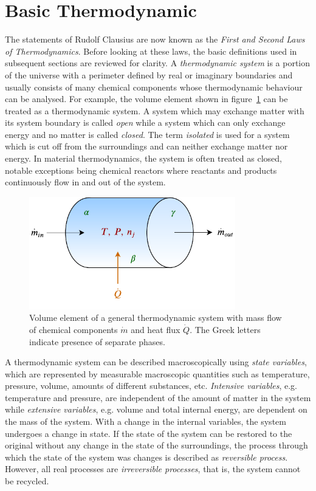 \section{Basic Thermodynamic}
	The statements of Rudolf Clausius are now known as the \emph{First and Second Laws of Thermodynamics}. Before looking at these laws, the basic definitions used in subsequent sections are reviewed for clarity. A \emph{thermodynamic system} is a portion of the universe with a perimeter defined by real or imaginary boundaries and usually consists of many chemical components whose thermodynamic behaviour can be analysed. For example, the volume element shown in figure~\ref{fig:system} can be treated as a thermodynamic system. A system which may exchange matter with its system boundary is called \emph{open} while a system which can only exchange energy and no matter is called \emph{closed}. The term \emph{isolated} is used for a system which is cut off from the surroundings and can neither exchange matter nor energy. In material thermodynamics, the system is often treated as closed, notable exceptions being chemical reactors where reactants and products continuously flow in and out of the system. 
 	\begin{figure}[htb]
		\centering
		\includegraphics[width=0.8\textwidth]{figures/System.pdf}
		\caption{Volume element of a general thermodynamic system with mass flow of chemical components $\dot{m}$ and heat flux $\dot{Q}$. The Greek letters indicate presence of separate phases.}
		\label{fig:system}
	\end{figure}
	
	A thermodynamic system can be described macroscopically using \emph{state variables}, which are represented by measurable macroscopic quantities such as temperature, pressure, volume, amounts of different substances, etc. \emph{Intensive variables}, e.g. temperature and pressure,  are independent of the amount of matter in the system  while  \emph{extensive variables}, e.g. volume and total internal energy, are dependent on the mass of the system.  With a change in the internal variables, the system undergoes a change in state. If the state of the system can be restored to the original without any change in the state of the surroundings, the process through which the state of the system was changes is described as \emph{reversible process}. However, all real processes are \emph{irreversible processes}, that is, the system cannot be recycled. 
	

